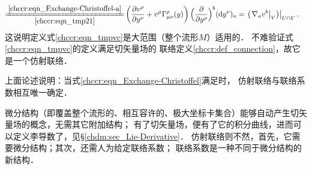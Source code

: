 \begin{align*}
     \xlongequal[\ref{chccr:eqn_tmp21}]{\ref{chccr:eqn_Exchange-Christoffel-a}} &
      \left( \frac{\partial v^\rho}{\partial y^\nu}
     +v^\mu \Gamma^{\rho}_{\mu\nu}(y) \right)
     \Bigl(\frac{\partial}{\partial y^\rho}\Bigr)^b({\rm d}y^\nu)_a
     = \left. \left(\left. \nabla_a v^b \right|_{V}\right) \right|_{U\cap V}  .
\end{align*}
这说明定义式\eqref{chccr:eqn_tmpvc}是大范围（整个流形$M$）适用的．
不难验证式\eqref{chccr:eqn_tmpvc}的定义满足{\kaishu 切矢量场}的
联络定义\ref{chccr:def_connection}，故它是一个仿射联络．

\begin{remark}\label{chccr:remark_con-Nabla}
上面论述说明：当式\eqref{chccr:eqn_Exchange-Christoffel}满足时，
仿射联络与联络系数相互唯一确定．
\end{remark}




    微分结构（即覆盖整个流形的、相互容许的、极大坐标卡集合）能够自动产生切矢量场的概念，无需其它附加结构；
    有了切矢量场，便有了它的积分曲线，进而可以定义李导数了，见\S\ref{chdm:sec_Lie-Derivative}．
    仿射联络则不然，首先，它需要微分结构；其次，还需人为给定联络系数；
    联络系数是一种不同于微分结构的新结构．




